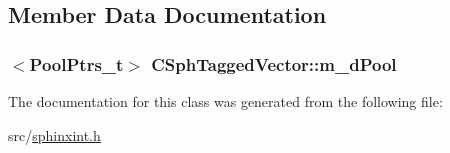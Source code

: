 \subsection{Member Data Documentation}
\hypertarget{classCSphTaggedVector_a19d2232fee96a8ddbfc2bf22c70bc658}{
\subsubsection[{m\-\_\-d\-Pool}]{$<${\bf Pool\-Ptrs\-\_\-t}$>$ C\-Sph\-Tagged\-Vector\-::m\-\_\-d\-Pool\hspace{0.3cm}{\ttfamily [private]}}}\label{classCSphTaggedVector_a19d2232fee96a8ddbfc2bf22c70bc658}


The documentation for this class was generated from the following file\-:\begin{DoxyCompactItemize}
\item 
src/\hyperlink{sphinxint_8h}{sphinxint.\-h}\end{DoxyCompactItemize}
